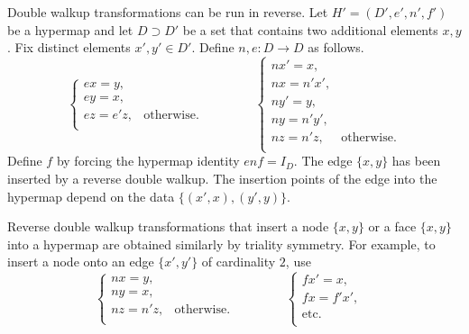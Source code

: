 \begin{remark}\label{rem:reverse-double-walkup}
Double walkup transformations can be run in reverse.
Let $H'=(D',e',n',f')$ be
a hypermap and let $D\supset D'$ be a set that contains two additional elements
$x,y$.  Fix distinct elements $x',y'\in D'$.  Define $n,e:D\to D$ as follows.
\begin{displaymath}
\begin{cases} 
e x = y, &\\
e y = x,&\\
e z = e' z,&\text{otherwise.}\\
\end{cases}
\qquad\qquad
\begin{cases} 
n x' = x, &\\
n x =  n' x',&\\
n y' = y,&\\
n y =  n' y',&\\
n z = n' z, &\text{otherwise.}\\
\end{cases}
\end{displaymath}
Define $f$ by forcing the hypermap identity $e n f = I_D$.  
The edge $\{x,y\}$ has been inserted by a reverse double walkup.  The insertion points of the edge
into the hypermap
depend on the data $\{(x',x),(y',y)\}$.   

Reverse double walkup transformations that
insert a node $\{x,y\}$ or a face $\{x,y\}$ into a hypermap are obtained similarly  by triality symmetry.  For example, to insert a node onto an edge $\{x',y'\}$ of cardinality $2$, use
\begin{displaymath}
\begin{cases} 
n x = y, &\\
n y = x,&\\
n z = n' z,&\text{otherwise.}\\
\end{cases}
\qquad\qquad
\begin{cases} 
f x' = x, &\\
f x =  f' x',&\\
\text{etc.}&\\%
\end{cases}
\end{displaymath}
%
\end{remark}

